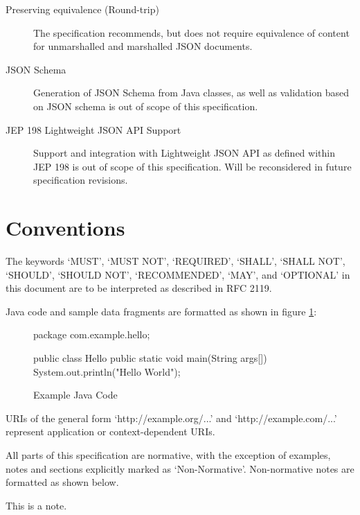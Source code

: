 \begin{description}

\item[Preserving equivalence (Round-trip)] The specification recommends, but does not require equivalence of content for unmarshalled and marshalled JSON documents.

\item[JSON Schema] Generation of JSON Schema from Java classes, as well as validation based on JSON schema is out of scope of this specification.

\item[JEP 198 Lightweight JSON API Support] Support and integration with Lightweight JSON API as defined within JEP 198 is out of scope of this specification. Will be reconsidered in future specification revisions.

\end{description}

\section{Conventions}

The keywords `MUST', `MUST NOT', `REQUIRED', `SHALL', `SHALL NOT', `SHOULD', `SHOULD NOT', `RECOMMENDED', `MAY', and `OPTIONAL' in this document are to be interpreted as described in RFC 2119\cite{rfc2119}. 

Java code and sample data fragments are formatted as shown in figure \ref{ex1}:

\begin{figure}[hbtp]
\caption{Example Java Code}
\label{ex1}
\begin{listing}{1}
package com.example.hello;

public class Hello {
    public static void main(String args[]) {
        System.out.println("Hello World");
    }
}\end{listing}
\end{figure}

URIs of the general form `http://example.org/...' and `http://example.com/...' represent application or context-dependent URIs.

All parts of this specification are normative, with the exception of examples, notes and sections explicitly marked as `Non-Normative'. Non-normative notes are formatted as shown below.

\begin{nnnote*}
This is a note.
\end{nnnote*}

